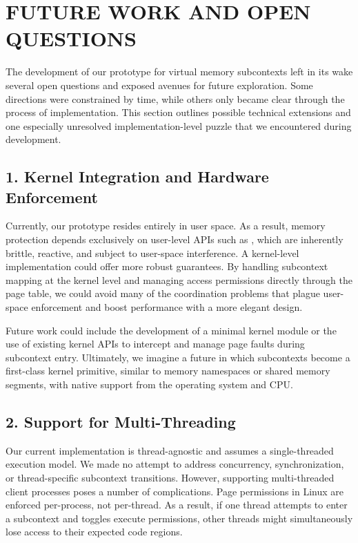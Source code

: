 \chapter*{FUTURE WORK AND OPEN QUESTIONS}
\thispagestyle{fancy}

The development of our prototype for virtual memory subcontexts left in its wake several open questions and exposed avenues for future exploration. Some directions were constrained by time, while others only became clear through the process of implementation. This section outlines possible technical extensions and one especially unresolved implementation-level puzzle that we encountered during development.

\section*{1. Kernel Integration and Hardware Enforcement}
Currently, our prototype resides entirely in user space. As a result, memory protection depends exclusively on user-level APIs such as , which are inherently brittle, reactive, and subject to user-space interference. A kernel-level implementation could offer more robust guarantees. By handling subcontext mapping at the kernel level and managing access permissions directly through the page table, we could avoid many of the coordination problems that plague user-space enforcement and boost performance with a more elegant design.

Future work could include the development of a minimal kernel module or the use of existing kernel APIs to intercept and manage page faults during subcontext entry. Ultimately, we imagine a future in which subcontexts become a first-class kernel primitive, similar to memory namespaces or shared memory segments, with native support from the operating system and CPU.

\section*{2. Support for Multi-Threading}
Our current implementation is thread-agnostic and assumes a single-threaded execution model. We made no attempt to address concurrency, synchronization, or thread-specific subcontext transitions. However, supporting multi-threaded client processes poses a number of complications. Page permissions in Linux are enforced per-process, not per-thread. As a result, if one thread attempts to enter a subcontext and toggles execute permissions, other threads might simultaneously lose access to their expected code regions.

